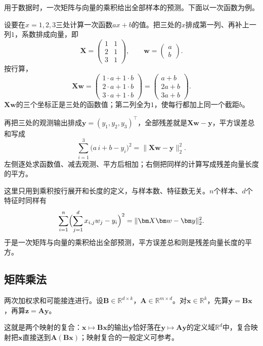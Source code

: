 用于数据时，一次矩阵与向量的乘积给出全部样本的预测。下面以一次函数为例。
\begin{example}[用矩阵与向量的乘积计算一次函数的取值与残差]
\label{ex:ls-affine-predictions}
设要在$x=1,2,3$三处计算一次函数$ax+b$的值。把三处的$x$排成第一列、再补上一列$1$，系数排成向量，即
\[
\bm X=\begin{pmatrix}1&1\\2&1\\3&1\end{pmatrix},\qquad
\bm w=\begin{pmatrix}a\\b\end{pmatrix}.
\]
按行算，
\[
 \bm X\bm w=\begin{pmatrix}1\cdot a+1\cdot b\\2\cdot a+1\cdot b\\3\cdot a+1\cdot b\end{pmatrix}=\begin{pmatrix}a+b\\2a+b\\3a+b\end{pmatrix}.
\]
$\bm X\bm w$的三个坐标正是三处的函数值；第二列全为$1$，使每行都加上同一个截距$b$。

再把三处的观测输出排成$\bm y=(y_1,y_2,y_3)^\top$，全部残差就是$\bm X\bm w-\bm y$，平方误差总和写成
\[
 \sum_{i=1}^3\bigl(a\,i+b-y_i\bigr)^2
 =\lVert\bm X\bm w-\bm y\rVert_2^2.
\]
左侧逐处求函数值、减去观测、平方后相加；右侧把同样的计算写成残差向量长度的平方。

这里只用到乘积按行展开和长度的定义，与样本数、特征数无关。$n$个样本、$d$个特征时同样有
\[
 \sum_{i=1}^n\Bigl(\sum_{j=1}^d x_{i,j}w_j-y_i\Bigr)^2=\lVert\bm X\bm w-\bm y\rVert_2^2.
\]
于是一次矩阵与向量的乘积给出全部预测，平方误差总和则是残差向量长度的平方。
\end{example}

\subsection{矩阵乘法}
\label{sec:ls-matrix-operations}
\label{sec:ls-multiplication}
\label{sec:prelim-linear-actions-composition}

两次加权求和可能接连进行。设$\bm B\in\mathbb R^{d\times k}$，$\bm A\in\mathbb R^{m\times d}$。对$\bm x\in\mathbb R^k$，先算$\bm y=\bm B\bm x$，再算$\bm z=\bm A\bm y$。

这就是两个映射的复合：$\bm x\mapsto\bm B\bm x$的输出$\bm y$恰好落在$\bm y\mapsto\bm A\bm y$的定义域$\mathbb R^d$中，复合映射把$\bm x$直接送到$\bm A(\bm B\bm x)$；映射复合的一般定义可参考。

